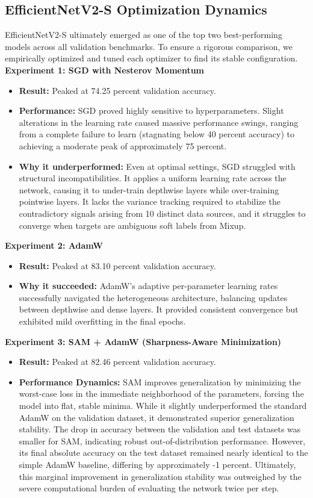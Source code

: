\subsection{EfficientNetV2-S Optimization Dynamics}
EfficientNetV2-S ultimately emerged as one of the top two best-performing models across all validation benchmarks. To ensure a rigorous comparison, we empirically optimized and tuned each optimizer to find its stable configuration.
\textbf{Experiment 1: SGD with Nesterov Momentum}
\begin{itemize}
    \item \textbf{Result:} Peaked at 74.25 percent validation accuracy.
    \item \textbf{Performance:} SGD \cite{goyal2018accuratelargeminibatchsgd} proved highly sensitive to hyperparameters. Slight alterations in the learning rate caused massive performance swings, ranging from a complete failure to learn (stagnating below 40 percent accuracy) to achieving a moderate peak of approximately 75 percent.
    \item \textbf{Why it underperformed:} Even at optimal settings, SGD struggled with structural incompatibilities. It applies a uniform learning rate across the network, causing it to under-train depthwise layers while over-training pointwise layers. It lacks the variance tracking required to stabilize the contradictory signals arising from 10 distinct data sources, and it struggles to converge when targets are ambiguous soft labels from Mixup.
\end{itemize}
\textbf{Experiment 2: AdamW}
\begin{itemize}
    \item \textbf{Result:} Peaked at 83.10 percent validation accuracy.
    \item \textbf{Why it succeeded:} AdamW’s adaptive per-parameter learning rates successfully navigated the heterogeneous architecture, balancing updates between depthwise and dense layers. It provided consistent convergence but exhibited mild overfitting in the final epochs.
\end{itemize}
\textbf{Experiment 3: SAM + AdamW (Sharpness-Aware Minimization)}
\begin{itemize}
    \item \textbf{Result:} Peaked at 82.46 percent validation accuracy.
    \item \textbf{Performance Dynamics:} SAM \cite{foret2021sharpnessawareminimizationefficientlyimproving} improves generalization by minimizing the worst-case loss in the immediate neighborhood of the parameters, forcing the model into flat, stable minima. While it slightly underperformed the standard AdamW on the validation dataset, it demonstrated superior generalization stability. The drop in accuracy between the validation and test datasets was smaller for SAM, indicating robust out-of-distribution performance. However, its final absolute accuracy on the test dataset remained nearly identical to the simple AdamW baseline, differing by approximately -1 percent. Ultimately, this marginal improvement in generalization stability was outweighed by the severe computational burden of evaluating the network twice per step.
\end{itemize}



